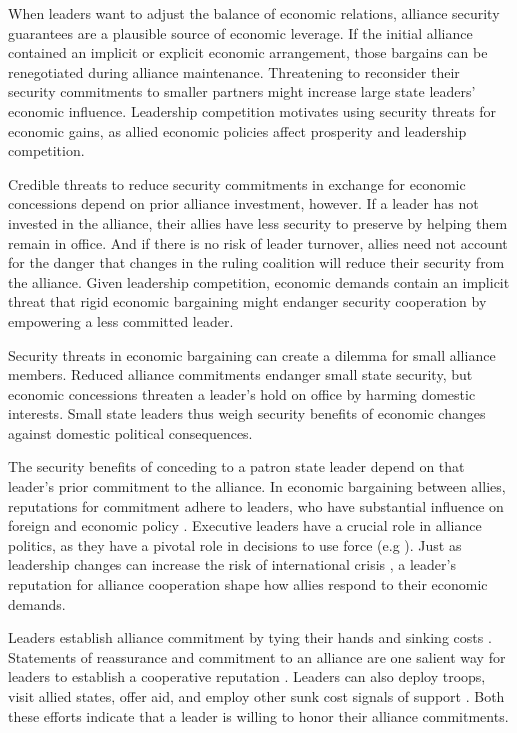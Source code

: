\documentclass[12pt]{article}
\begin{document}
When leaders want to adjust the balance of economic relations, alliance security guarantees are a plausible source of economic leverage. 
If the initial alliance contained an implicit or explicit economic arrangement, those bargains can be renegotiated during alliance maintenance. 
Threatening to reconsider their security commitments to smaller partners might increase large state leaders' economic influence. 
Leadership competition motivates using security threats for economic gains, as allied economic policies affect prosperity and leadership competition. 


Credible threats to reduce security commitments in exchange for economic concessions depend on prior alliance investment, however. 
If a leader has not invested in the alliance, their allies have less security to preserve by helping them remain in office. 
And if there is no risk of leader turnover, allies need not account for the danger that changes in the ruling coalition will reduce their security from the alliance. 
Given leadership competition, economic demands contain an implicit threat that rigid economic bargaining might endanger security cooperation by empowering a less committed leader.


Security threats in economic bargaining can create a dilemma for small alliance members. 
Reduced alliance commitments endanger small state security, but economic concessions threaten a leader's hold on office by harming domestic interests. 
Small state leaders thus weigh security benefits of economic changes against domestic political consequences.


The security benefits of conceding to a patron state leader depend on that leader's prior commitment to the alliance. 
In economic bargaining between allies, reputations for commitment adhere to leaders, who have substantial influence on foreign and economic policy \citep{Renshonetal2018}.
Executive leaders have a crucial role in alliance politics, as they have a pivotal role in decisions to use force (e.g \citep{Colgan2013, ColganWeeks2015}).
Just as leadership changes can increase the risk of international crisis \citep{Wolford2007}, a leader's reputation for alliance cooperation shape how allies respond to their economic demands. 


Leaders establish alliance commitment by tying their hands and sinking costs \citep{Fearon1997}. 
Statements of reassurance and commitment to an alliance are one salient way for leaders to establish a cooperative reputation \citep{Blankenship2020}.
Leaders can also deploy troops, visit allied states, offer aid, and employ other sunk cost signals of support \citep{McManusNieman2019}.
Both these efforts indicate that a leader is willing to honor their alliance commitments. 
\end{document}
